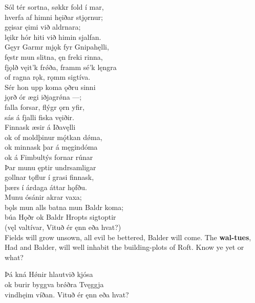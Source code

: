 \bva Sól tér sortna, \hld søkkr fold í mar, \\%
hverfa af himni \hld hęiðar stjǫrnur; \\%
gęisar ęimi \hld við aldrnara; \\%
lęikr hór hiti \hld við himin sjalfan.\\%

\bva Gęyr Garmr mjǫk \hld fyr Gnipahęlli, \\%
fęstr mun slitna, \hld ęn freki rinna, \\%
fjǫlð vęit'k frǿða, \hld framm sé'k lęngra \\%
of ragna rǫk, \hld rǫmm sigtíva.\\%

\bva Sér hon upp koma \hld ǫðru sinni \\%
jǫrð ór ægi \hld iðjagrǿna —; \\%
falla forsar, \hld flýgr ǫrn yfir, \\%
sás á fjalli \hld fiska vęiðir.\\%

\bva Finnask æsir \hld á Iðavęlli \\%
ok of moldþinur \hld mǫ́tkan dǿma, \\%
ok minnask þar \hld á męgindóma \\%
ok á Fimbultýs \hld fornar rúnar\\%

\bva Þar munu ęptir \hld undrsamligar \\%
gollnar tǫflur \hld í grasi finnask, \\%
þærs í árdaga \hld áttar hǫfðu.\\%

\bva Munu ósánir \hld akrar vaxa; \\%
bǫls mun alls batna \hld mun Baldr koma; \\%
búa Hǫðr ok Baldr \hld Hropts sigtoptir \\%
(vęl valtívar, \hld Vituð ér ęnn eða hvat?)\\%

\bvb Fields will grow unsown, all evil be bettered, Balder will come. The \textbf{wal-tues}, Had and Balder, will well inhabit the building-plots of Roft. Know ye yet or what?

\bva Þá kná Hǿnir \hld hlautvið kjósa \\%
ok burir byggva \hld brǿðra Tvęggja \\%
vindhęim víðan. \hld Vituð ér ęnn eða hvat?\\%

